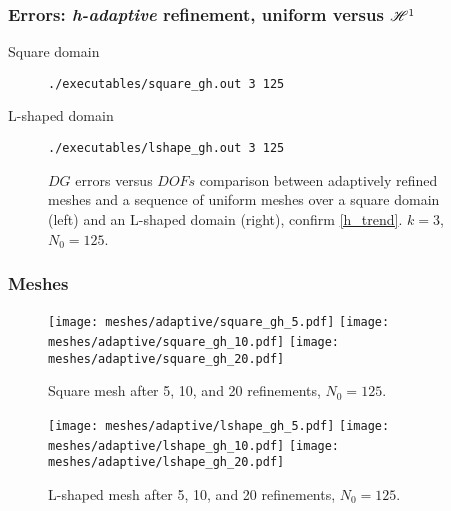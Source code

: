 \begin{frame}[fragile]
    \frametitle{Errors: \textit{h-adaptive} refinement, uniform versus $\mathscr{H}^1$}

    \begin{description}
        \item[Square domain] \lstinline{./executables/square_gh.out 3 125}
        \item[L-shaped domain] \lstinline{./executables/lshape_gh.out 3 125}
    \end{description}

    \begin{figure}[!ht]
        
        \caption{$DG$ errors versus $DOFs$ comparison between adaptively refined meshes and a sequence of uniform meshes over a square domain (left) and an L-shaped domain (right), confirm \eqref{h_trend}. $k = 3$, $N_0 = 125$.}
    \end{figure}
\end{frame}

\begin{frame}
    \frametitle{Meshes}

\begin{figure}[!ht]
    \centering
    \texttt{[image: meshes/adaptive/square\_gh\_5.pdf]}
    \texttt{[image: meshes/adaptive/square\_gh\_10.pdf]}
    \texttt{[image: meshes/adaptive/square\_gh\_20.pdf]}
    \caption{Square mesh after 5, 10, and 20 refinements, $N_0 = 125$.}
\end{figure}

\begin{figure}[!ht]
    \centering
    \texttt{[image: meshes/adaptive/lshape\_gh\_5.pdf]}
    \texttt{[image: meshes/adaptive/lshape\_gh\_10.pdf]}
    \texttt{[image: meshes/adaptive/lshape\_gh\_20.pdf]}
    \caption{L-shaped mesh after 5, 10, and 20 refinements, $N_0 = 125$.}
\end{figure}
\end{frame}

